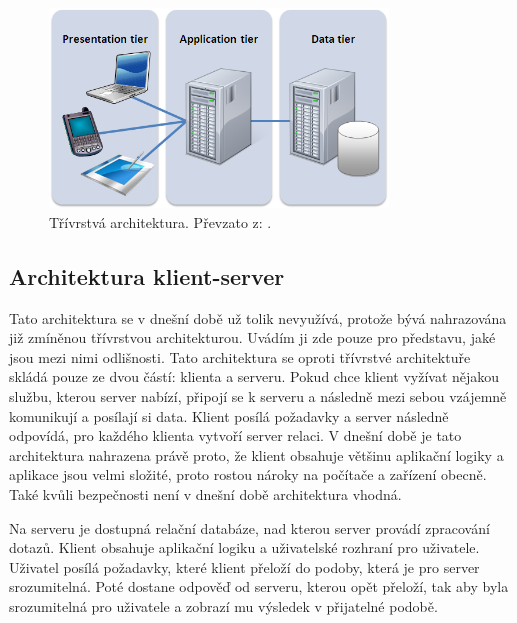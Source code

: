 \begin{figure}[H]
    \begin{center}
    \includegraphics[width=90mm]{obrazky-figures/3vrstva.png}
    
    \caption{Třívrstvá architektura. Převzato z: \cite{threelayer}.}
\end{center}
\end{figure}


\subsection{Architektura klient-server}

Tato architektura se v dnešní době už tolik nevyužívá, protože bývá nahrazována již zmíněnou třívrstvou architekturou. Uvádím ji zde pouze pro představu, jaké jsou mezi nimi odlišnosti. Tato architektura se oproti třívrstvé architektuře skládá pouze ze dvou částí: klienta a serveru. Pokud chce klient vyžívat nějakou službu, kterou server nabízí, připojí se k serveru a následně mezi sebou vzájemně komunikují a posílají si data. Klient posílá požadavky a server následně odpovídá, pro každého klienta vytvoří server relaci. V dnešní době je tato architektura nahrazena právě proto, že klient obsahuje většinu aplikační logiky a aplikace jsou velmi složité, proto rostou nároky na počítače a zařízení obecně. Také kvůli bezpečnosti není v dnešní době architektura vhodná. \cite{clientserver}

Na serveru je dostupná relační databáze, nad kterou server provádí zpracování dotazů. Klient obsahuje aplikační logiku a uživatelské rozhraní pro uživatele. Uživatel posílá požadavky, které klient přeloží do podoby, která je pro server srozumitelná. Poté dostane odpověď od serveru, kterou opět přeloží, tak aby byla srozumitelná pro uživatele a zobrazí mu výsledek v přijatelné podobě. \cite{clientserver}

